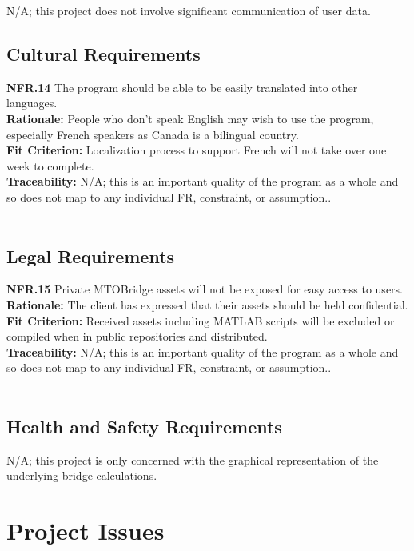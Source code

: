 \documentclass[12pt]{article}
\begin{document}
N/A; this project does not involve significant communication of user data.\\

\subsection{Cultural Requirements}

  \textbf{NFR.14} The program should be able to be easily translated into other languages.\\
  \textbf{Rationale:} People who don't speak English may wish to use the program, especially French speakers as Canada is a bilingual country.\\
  \textbf{Fit Criterion:} Localization process to support French will not take over one week to complete.\\
  \textbf{Traceability:} N/A; this is an important quality of the program as a whole and so does not map to any individual FR, constraint, or assumption..\\\\

\subsection{Legal Requirements}

  \textbf{NFR.15} Private MTOBridge assets will not be exposed for easy access to users.\\
  \textbf{Rationale:} The client has expressed that their assets should be held confidential.\\
  \textbf{Fit Criterion:} Received assets including MATLAB scripts will be excluded or compiled when in public repositories and distributed.\\
  \textbf{Traceability:} N/A; this is an important quality of the program as a whole and so does not map to any individual FR, constraint, or assumption..\\\\

\subsection{Health and Safety Requirements}

N/A; this project is only concerned with the graphical representation of the underlying bridge calculations.\\

\section{Project Issues}
\end{document}
